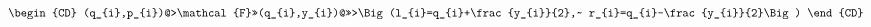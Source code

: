 \begin{equation}\label{eq100:ps}
\begin{CD}
(q_{i},p_{i})@>\mathcal{F}>>(q_{i},y_{i})@>>>\Big(l_{i}=q_{i}+\frac{y_{i}}{2},~ r_{i}=q_{i}-\frac{y_{i}}{2}\Big)
\end{CD}
\end{equation}

